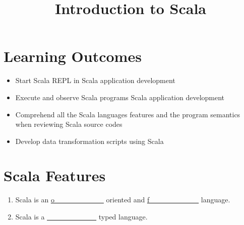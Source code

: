 \documentclass[10pt]{article}
\title{%
  Introduction to Scala }
\begin{document}
\maketitle \makeatactive
\thispagestyle{fancy}

\lstset{language=Python}



\section{Learning Outcomes} \label{sec:aims}
\begin{itemize}
 \item Start Scala REPL in Scala application development
 \item Execute and observe Scala programs Scala application
   development
 \item Comprehend all the Scala languages features and the program semantics when reviewing Scala source codes
 \item Develop data transformation scripts using Scala
\end{itemize}




\section{Scala Features}
\begin{enumerate}
\item Scala is an \underline{o~~~~~~~~~~~~~~} oriented and \underline{f~~~~~~~~~~~~~~} language. 
\item Scala is a \underline{~~~~~~~~~~~~~~} typed language.
\end{enumerate}
\end{document}
